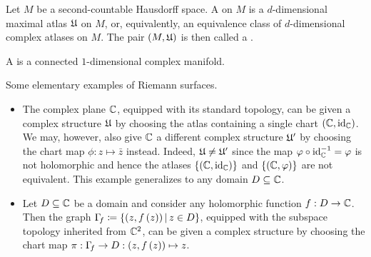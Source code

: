 \begin{definition}
    Let $M$ be a second-countable Hausdorff space. A   on $M$ is a $d$-dimensional maximal atlas $\mathfrak{U}$ on $M$, or, equivalently, an equivalence class of $d$-dimensional complex atlases on $M$. The pair $\left(M,\mathfrak{U}\right)$ is then called a  .
\end{definition}
\begin{definition}
    A  is a connected $1$-dimensional complex manifold.
\end{definition}
\begin{example}
    Some elementary examples of Riemann surfaces.
    \begin{itemize}
        \item The complex plane $\mathbb{C}$, equipped with its standard topology, can be given a complex structure $\mathfrak{U}$ by choosing the atlas containing a single chart $\left(\mathbb{C},\operatorname{id}_{\mathbb{C}}\right)$. We may, however, also give $\mathbb{C}$ a different complex structure $\mathfrak{U}'$ by choosing the chart map $\phi:z\mapsto\bar{z}$ instead. Indeed, $\mathfrak{U}\neq\mathfrak{U}'$ since the map $\varphi\circ\operatorname{id}_{\mathbb{C}}^{-1}=\varphi$ is not holomorphic and hence the atlases $\left\{\left(\mathbb{C},\operatorname{id}_{\mathbb{C}}\right)\right\}$ and $\left\{\left(\mathbb{C},\varphi\right)\right\}$ are not equivalent. This example generalizes to any domain $D\subseteq\mathbb{C}$.
        \item Let $D\subseteq\mathbb{C}$ be a domain and consider any holomorphic function $f:D\to\mathbb{C}$. Then the graph $\Gamma\!_f\coloneqq\left\{\left(z,f\left(z\right)\right)\,\middle\vert\, z\in D\right\}$, equipped with the subspace topology inherited from $\mathbb{C}^2$, can be given a complex structure by choosing the chart map $\pi:\Gamma\!_f\to D:\left(z,f\left(z\right)\right)\mapsto z$.\exqed
    \end{itemize}
\end{example}
